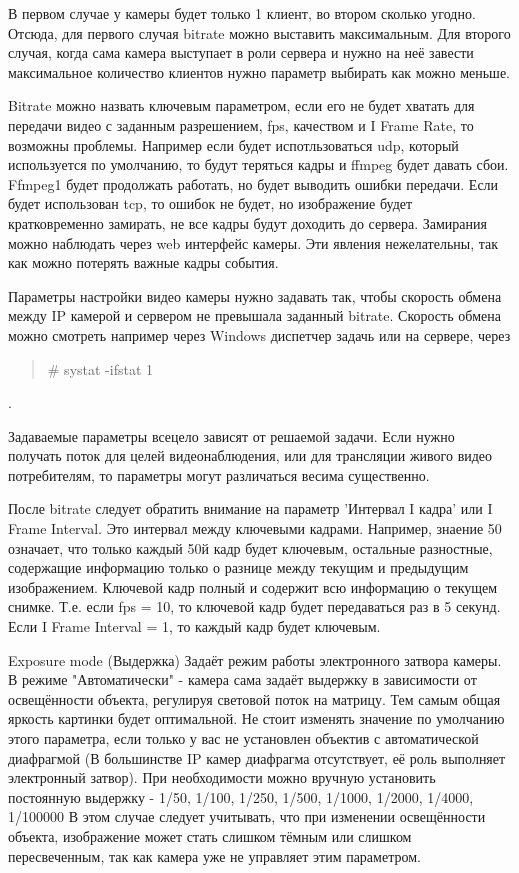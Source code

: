 \documentclass[12pt]{article}
\begin{document}
 В первом случае у камеры будет только 1 клиент, во втором сколько угодно. Отсюда, для первого случая bitrate можно выставить максимальным. Для второго случая, когда сама камера выступает в роли сервера и нужно на неё завести максимальное количество клиентов нужно параметр выбирать как можно меньше.

Bitrate можно назвать ключевым параметром, если его не будет хватать для передачи видео с заданным разрешением, fps, качеством и I Frame Rate, то возможны проблемы. Например если будет испотльзоваться udp, который используется по умолчанию, то будут теряться кадры и ffmpeg будет давать сбои. Ffmpeg1 будет продолжать работать, но будет выводить ошибки передачи. Если будет использован tcp, то ошибок не будет, но изображение будет кратковременно замирать, не все кадры будут доходить до сервера. Замирания можно наблюдать через web интерфейс камеры. Эти явления нежелательны, так как можно потерять важные кадры события.

Параметры настройки видео камеры нужно задавать так, чтобы скорость обмена между IP камерой и сервером не превышала заданный bitrate. Скорость обмена можно смотреть например через Windows диспетчер задачь или на сервере, через \begin{quote}
\# systat -ifstat 1
\end{quote}.

Задаваемые параметры всецело зависят от решаемой задачи. Если нужно получать поток для целей видеонаблюдения, или для трансляции живого видео потребителям, то параметры могут различаться весима существенно.

После bitrate следует обратить внимание на параметр 'Интервал I кадра' или I Frame Interval. Это интервал между ключевыми кадрами. Например, знаение 50 означает, что только каждый 50й кадр будет ключевым, остальные разностные, содержащие информацию только о разнице между текущим и предыдущим изображением. Ключевой кадр полный и содержит всю информацию о текущем снимке. Т.е. если fps = 10, то ключевой кадр будет передаваться раз в 5 секунд. Если I Frame Interval = 1, то каждый кадр будет ключевым. 

Exposure mode (Выдержка)
Задаёт режим работы электронного затвора камеры. В режиме "Автоматически" - камера сама задаёт выдержку в зависимости от освещённости объекта, регулируя световой поток на матрицу. Тем самым общая яркость картинки будет оптимальной. Не стоит изменять значение по умолчанию этого параметра, если только у вас не установлен объектив с автоматической диафрагмой (В большинстве IP камер диафрагма отсутствует, её роль выполняет электронный затвор).
При необходимости можно вручную установить постоянную выдержку - 1/50, 1/100, 1/250, 1/500, 1/1000, 1/2000, 1/4000, 1/100000
В этом случае следует учитывать, что при изменении освещённости объекта, изображение может стать слишком тёмным или слишком пересвеченным, так как камера уже не управляет этим параметром.\\
\end{document}
